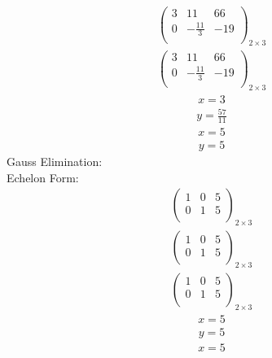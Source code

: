 \documentclass{article}
\begin{document}
\begin{align*}
\left(
\begin{array}{cc|c}
3 & 11 & 66\\
0 & -\frac{11}{3} & -19\\
\end{array}
\right)_{2\times 3}
\end{align*}
\begin{align*}
\left(
\begin{array}{cc|c}
3 & 11 & 66\\
0 & -\frac{11}{3} & -19\\
\end{array}
\right)_{2\times 3}
\end{align*}
\begin{align*}
x=3\end{align*}
\begin{align*}
y=\frac{57}{11}\end{align*}
\begin{align*}
x=5\end{align*}
\begin{align*}
y=5\end{align*}
Gauss Elimination:\\
Echelon Form:\\
\begin{align*}
\left(
\begin{array}{cc|c}
1 & 0 & 5\\
0 & 1 & 5\\
\end{array}
\right)_{2\times 3}
\end{align*}
\begin{align*}
\left(
\begin{array}{cc|c}
1 & 0 & 5\\
0 & 1 & 5\\
\end{array}
\right)_{2\times 3}
\end{align*}
\begin{align*}
\left(
\begin{array}{cc|c}
1 & 0 & 5\\
0 & 1 & 5\\
\end{array}
\right)_{2\times 3}
\end{align*}
\begin{align*}
x=5\end{align*}
\begin{align*}
y=5\end{align*}
\begin{align*}
x=5\end{align*}
\end{document}
